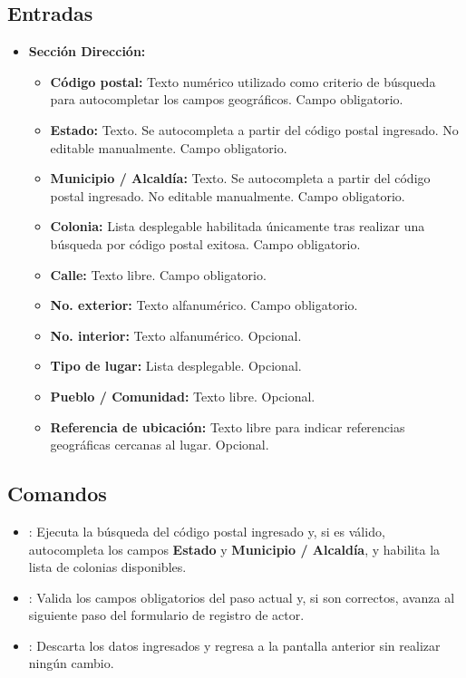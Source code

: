 \subsection{Entradas}
\begin{itemize}
	\item \textbf{Sección Dirección:}
	\begin{itemize}
		\item \textbf{Código postal:} Texto numérico utilizado como criterio de 
		búsqueda para autocompletar los campos geográficos. Campo obligatorio.
		\item \textbf{Estado:} Texto. Se autocompleta a partir del código postal 
		ingresado. No editable manualmente. Campo obligatorio.
		\item \textbf{Municipio / Alcaldía:} Texto. Se autocompleta a partir del 
		código postal ingresado. No editable manualmente. Campo obligatorio.
		\item \textbf{Colonia:} Lista desplegable habilitada únicamente tras 
		realizar una búsqueda por código postal exitosa. Campo obligatorio.
		\item \textbf{Calle:} Texto libre. Campo obligatorio.
		\item \textbf{No. exterior:} Texto alfanumérico. Campo obligatorio.
		\item \textbf{No. interior:} Texto alfanumérico. Opcional.
		\item \textbf{Tipo de lugar:} Lista desplegable. Opcional.
		\item \textbf{Pueblo / Comunidad:} Texto libre. Opcional.
		\item \textbf{Referencia de ubicación:} Texto libre para indicar 
		referencias geográficas cercanas al lugar. Opcional.
	\end{itemize}
\end{itemize}

\subsection{Comandos}
\begin{itemize}
	\item {}: Ejecuta la búsqueda del código postal ingresado y, 
	si es válido, autocompleta los campos \textbf{Estado} y \textbf{Municipio / 
		Alcaldía}, y habilita la lista de colonias disponibles.
	\item {}: Valida los campos obligatorios del paso actual 
	y, si son correctos, avanza al siguiente paso del formulario de registro de 
	actor.
	\item {}: Descarta los datos ingresados y regresa a la 
	pantalla anterior sin realizar ningún cambio.
\end{itemize}

